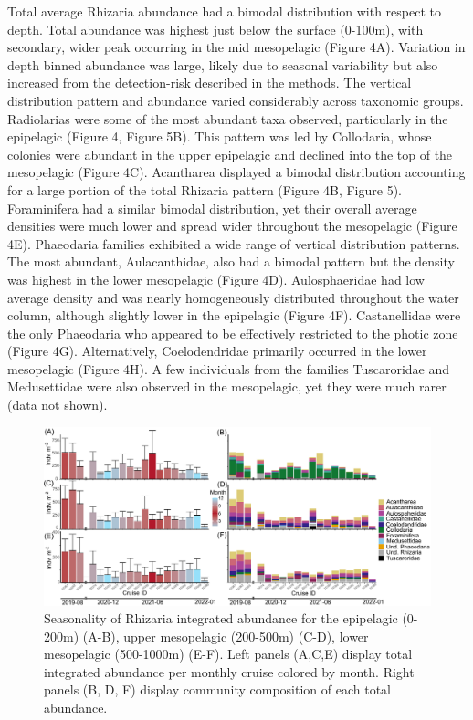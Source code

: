 \documentclass[
]{article}
\begin{document}
Total average Rhizaria abundance had a bimodal distribution with respect
to depth. Total abundance was highest just below the surface (0-100m),
with secondary, wider peak occurring in the mid mesopelagic (Figure 4A).
Variation in depth binned abundance was large, likely due to seasonal
variability but also increased from the detection-risk described in the
methods. The vertical distribution pattern and abundance varied
considerably across taxonomic groups. Radiolarias were some of the most
abundant taxa observed, particularly in the epipelagic (Figure 4, Figure
5B). This pattern was led by Collodaria, whose colonies were abundant in
the upper epipelagic and declined into the top of the mesopelagic
(Figure 4C). Acantharea displayed a bimodal distribution accounting for
a large portion of the total Rhizaria pattern (Figure 4B, Figure 5).
Foraminifera had a similar bimodal distribution, yet their overall
average densities were much lower and spread wider throughout the
mesopelagic (Figure 4E). Phaeodaria families exhibited a wide range of
vertical distribution patterns. The most abundant, Aulacanthidae, also
had a bimodal pattern but the density was highest in the lower
mesopelagic (Figure 4D). Aulosphaeridae had low average density and was
nearly homogeneously distributed throughout the water column, although
slightly lower in the epipelagic (Figure 4F). Castanellidae were the
only Phaeodaria who appeared to be effectively restricted to the photic
zone (Figure 4G). Alternatively, Coelodendridae primarily occurred in
the lower mesopelagic (Figure 4H). A few individuals from the families
Tuscaroridae and Medusettidae were also observed in the mesopelagic, yet
they were much rarer (data not shown).

\begin{figure}

{\centering \includegraphics{images/05_seasonality.pdf}

}

\caption{Seasonality of Rhizaria integrated abundance for the epipelagic
(0-200m) (A-B), upper mesopelagic (200-500m) (C-D), lower mesopelagic
(500-1000m) (E-F). Left panels (A,C,E) display total integrated
abundance per monthly cruise colored by month. Right panels (B, D, F)
display community composition of each total abundance.}

\end{figure}
\end{document}

